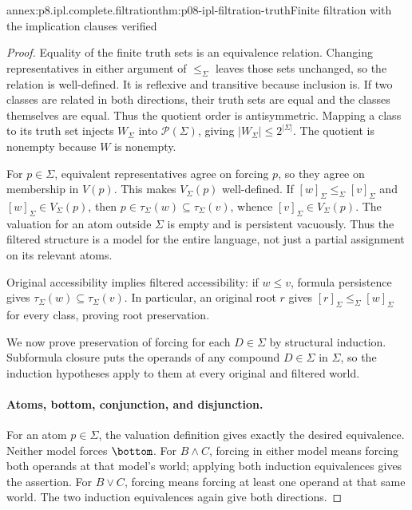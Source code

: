 \begin{annexitem}{annex:p8.ipl.complete.filtration}{thm:p08-ipl-filtration-truth}{Finite filtration with the implication clauses verified}
\begin{proof}
Equality of the finite truth sets is an equivalence relation. Changing
representatives in either argument of \(\leq_\Sigma\) leaves those
sets unchanged, so the relation is well-defined. It is reflexive and
transitive because inclusion is. If two classes are related in both
directions, their truth sets are equal and the classes themselves are
equal. Thus the quotient order is antisymmetric. Mapping a class to its
truth set injects \(W_\Sigma\) into \(\mathcal P(\Sigma)\),
giving \(|W_\Sigma|\leq2^{|\Sigma|}\). The quotient is nonempty
because \(W\) is nonempty.

For \(p\in\Sigma\), equivalent representatives agree on forcing
\(p\), so they agree on membership in \(V(p)\). This makes
\(V_\Sigma(p)\) well-defined. If \([w]_\Sigma\leq_\Sigma[v]_\Sigma\)
and \([w]_\Sigma\in V_\Sigma(p)\), then
\(p\in\tau_\Sigma(w)\subseteq\tau_\Sigma(v)\), whence
\([v]_\Sigma\in V_\Sigma(p)\). The valuation for an atom outside
\(\Sigma\) is empty and is persistent vacuously. Thus the filtered
structure is a model for the entire language, not just a partial
assignment on its relevant atoms.

Original accessibility implies filtered accessibility: if \(w\leq v\),
formula persistence gives \(\tau_\Sigma(w)\subseteq\tau_\Sigma(v)\).
In particular, an original root \(r\) gives
\([r]_\Sigma\leq_\Sigma[w]_\Sigma\) for every class, proving
root preservation.

We now prove preservation of forcing for each \(D\in\Sigma\) by
structural induction. Subformula closure puts the operands of any
compound \(D\in\Sigma\) in \(\Sigma\), so the induction
hypotheses apply to them at every original and filtered world.

\paragraph{Atoms, bottom, conjunction, and disjunction.}
For an atom \(p\in\Sigma\), the valuation definition gives exactly
the desired equivalence. Neither model forces \(\bottom\).
For \(B\land C\), forcing in either model means forcing both
operands at that model's world; applying both induction equivalences
gives the assertion. For \(B\lor C\), forcing means forcing at
least one operand at that same world. The two induction equivalences
again give both directions.


\end{proof}
\end{annexitem}
